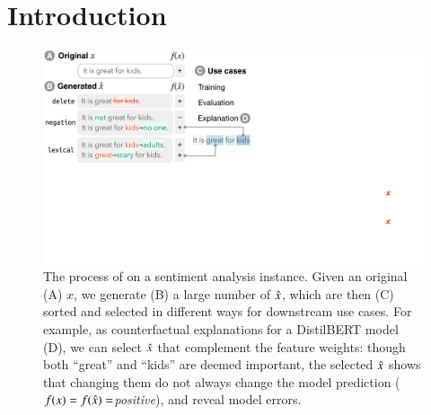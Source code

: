 \section{Introduction}
\label{sec:intro}

\begin{figure}[t]
\centering
\includegraphics[trim={0 18cm 31cm 0cm},clip, width=1\columnwidth]{figures/teaser.pdf}
\vspace{-15pt}
\caption{
The process of \sysname on a sentiment analysis instance.
Given an original (A) $x$, we generate (B) a large number of $\hat{x}$, which are then (C) sorted and selected in different ways for downstream use cases.
For example, as counterfactual explanations for a DistilBERT model (D), we can select $\hat{x}$ that complement the feature weights: though both ``great'' and ``kids'' are deemed important, the selected $\hat{x}$ shows that changing them do not always change the model prediction ($f(x)=f(\hat{x})=$\emph{positive}), and reveal model errors.
}
\vspace{-15pt}
\label{fig:teaser}
\end{figure} 
 

